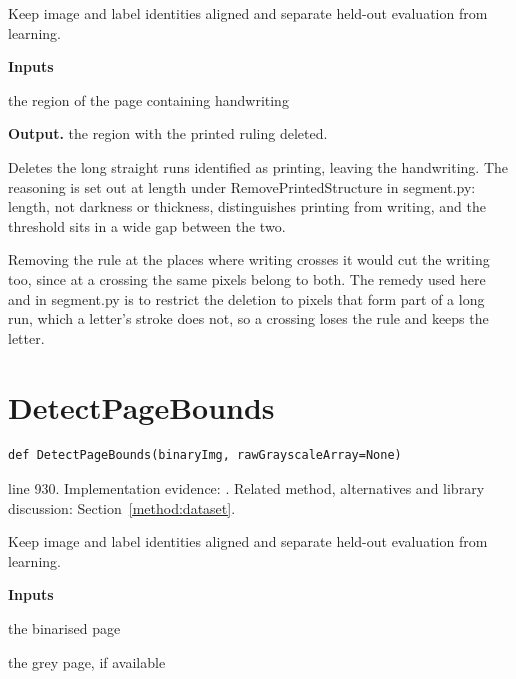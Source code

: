 Keep image and label identities aligned and separate held-out evaluation from learning.




\noindent\textbf{Inputs}
\begin{description}[leftmargin=2.2em,style=nextline,font=\normalfont\ttfamily]\setlength\itemsep{1pt}
  \item[{hwRegion}] \normalfont the region of the page containing handwriting
\end{description}

\noindent\textbf{Output.} the region with the printed ruling deleted.


Deletes the long straight runs identified as printing, leaving the handwriting. The reasoning is set out at length under RemovePrintedStructure in segment.py: length, not darkness or thickness, distinguishes printing from writing, and the threshold sits in a wide gap between the two.


Removing the rule at the places where writing crosses it would cut the writing too, since at a crossing the same pixels belong to both. The remedy used here and in segment.py is to restrict the deletion to pixels that form part of a long run, which a letter's stroke does not, so a crossing loses the rule and keeps the letter.



\section{DetectPageBounds}\label{fn:train:DetectPageBounds}
\begin{lstlisting}[style=sig]
def DetectPageBounds(binaryImg, rawGrayscaleArray=None)
\end{lstlisting}
 line 930. Implementation evidence: \cite{code2026}. Related method, alternatives and library discussion: Section~\ref{method:dataset}.


Keep image and label identities aligned and separate held-out evaluation from learning.




\noindent\textbf{Inputs}
\begin{description}[leftmargin=2.2em,style=nextline,font=\normalfont\ttfamily]\setlength\itemsep{1pt}
  \item[{binaryImg}] \normalfont the binarised page
  \item[{rawGrayscaleArray}] \normalfont the grey page, if available
\end{description}

